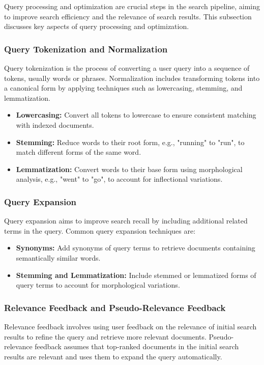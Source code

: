 \documentclass[12pt]{article}
\begin{document}
Query processing and optimization are crucial steps in the search pipeline, aiming to improve search efficiency and the relevance of search results. This subsection discusses key aspects of query processing and optimization.

\subsubsection{Query Tokenization and Normalization}
\label{sec:query_tokenization_normalization}
Query tokenization is the process of converting a user query into a sequence of tokens, usually words or phrases. Normalization includes transforming tokens into a canonical form by applying techniques such as lowercasing, stemming, and lemmatization.

\begin{itemize}
    \item \textbf{Lowercasing:} Convert all tokens to lowercase to ensure consistent matching with indexed documents.
    \item \textbf{Stemming:} Reduce words to their root form, e.g., "running" to "run", to match different forms of the same word.
    \item \textbf{Lemmatization:} Convert words to their base form using morphological analysis, e.g., "went" to "go", to account for inflectional variations.
\end{itemize}

\subsubsection{Query Expansion}
\label{sec:query_expansion}
Query expansion aims to improve search recall by including additional related terms in the query. Common query expansion techniques are:

\begin{itemize}
    \item \textbf{Synonyms:} Add synonyms of query terms to retrieve documents containing semantically similar words.
    \item \textbf{Stemming and Lemmatization:} Include stemmed or lemmatized forms of query terms to account for morphological variations.
\end{itemize}

\subsubsection{Relevance Feedback and Pseudo-Relevance Feedback}
\label{sec:relevance_feedback}
Relevance feedback involves using user feedback on the relevance of initial search results to refine the query and retrieve more relevant documents. Pseudo-relevance feedback assumes that top-ranked documents in the initial search results are relevant and uses them to expand the query automatically.
\end{document}
